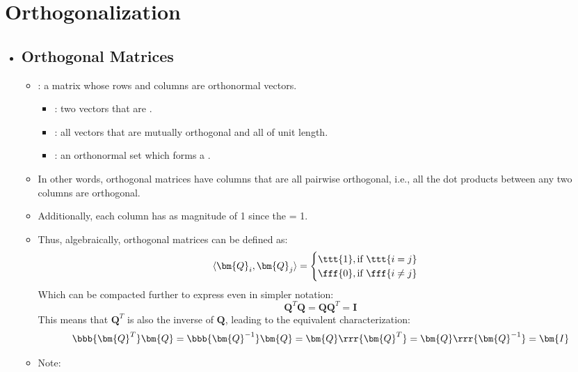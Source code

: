 \section{Orthogonalization}\label{Orthogonalization}
\begin{itemize}
  \item []
  
  \subsection{Orthogonal Matrices}\label{Orthogonal Matrices}
  \begin{itemize}
    \item {}: a matrix whose rows and columns are orthonormal vectors.
      \begin{itemize}
        \item {}: two vectors that are \hyperref[Geometric Interpretation of the Dot Product]{} \hyperref[Unit Vectors]{}.
        \item {}: all vectors that are mutually orthogonal and all of unit length.
        \item {}: an orthonormal set which forms a \hyperref[Basis]{}.
      \end{itemize}
    \item In other words, orthogonal matrices have columns that are all pairwise orthogonal, i.e., all the dot products between any two columns are orthogonal.
    \item Additionally, each column has as magnitude of 1 since the \hyperref[Vector Length]{} = 1.
    \item Thus, algebraically, orthogonal matrices can be defined as:
    \[%
    \langle \bm{Q}_i, \bm{Q}_j \rangle = 
    \begin{cases}
    \ttt{1}, \text{if}~\ttt{i=j} \\
    \fff{0}, \text{if}~\fff{i\neq j}
    \end{cases}
    \]%
    Which can be compacted further to express even in simpler notation:
    \[%
    \bm{Q}^T \bm{Q} = \bm{Q}\bm{Q}^T = \bm{I}
    \]%
    This means that \(\bm{Q}^T\) is also the inverse of \(\bm{Q}\), leading to the equivalent characterization: 
    \[%
    \bbb{\bm{Q}^T} \bm{Q} = \bbb{\bm{Q}^{-1}}\bm{Q} = \bm{Q}\rrr{\bm{Q}^T} = \bm{Q}\rrr{\bm{Q}^{-1}}  = \bm{I} 
    \]%
    \item Note: 
  \end{itemize}
  

\end{itemize}
